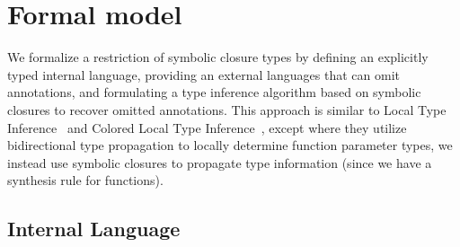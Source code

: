 %




\section{Formal model}

We formalize a restriction of symbolic closure types by defining an explicitly typed internal language,
providing an external languages that can omit annotations,
and formulating a type inference algorithm based on symbolic closures to recover omitted annotations.
This approach is similar to Local Type Inference~\cite{PierceLTI}
and Colored Local Type Inference~\cite{coloredlti01},
except where they utilize bidirectional type propagation to locally determine function parameter types,
we instead use symbolic closures to propagate type information
(since we have a synthesis rule for functions).

\subsection{Internal Language}


